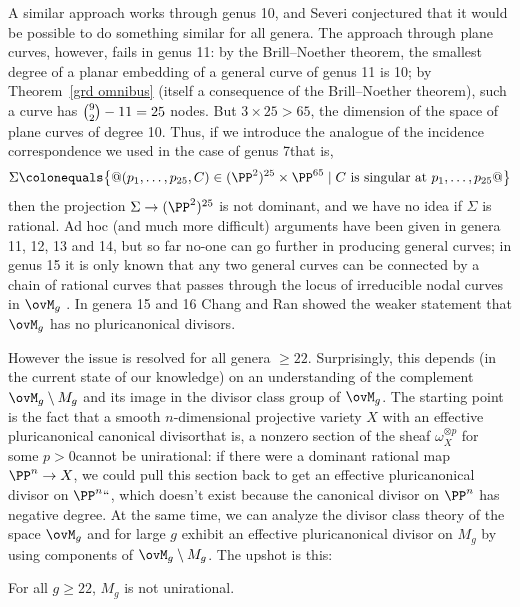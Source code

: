 A similar approach works through genus 10, and Severi conjectured that
%
it would be possible to do something similar for all genera. The
approach through plane curves, however, fails in genus 11: by the
Brill--Noether theorem,
%
the smallest degree of a planar embedding of a general curve of genus
11 is 10; by Theorem~\ref{grd omnibus} (itself a consequence of
the Brill--Noether theorem), such a curve has $\tbinom{9}{2}-11 = 25$
nodes. But $3 \times 25 > 65$, the dimension of the space of plane
curves of degree 10. Thus, if we introduce the analogue of the
incidence correspondence
%
we used in the case of genus 7\emdash that is,
$$
\Sigma \colonequals\bigl\{@(p_1,\dots,p_{25},C)\in(\PP^2)^{25} \times \PP^{65} 
\mid C \text{ is singular at } p_1,\dots,p_{25} @\bigr\}
$$
\emdash
then the projection $\Sigma \to (\PP^2)^{25}$ is not dominant, and we have no idea if $\Sigma$ is rational.
Ad hoc (and much more difficult) arguments have been given in genera
11, 12, 13 and 14, but so far no-one can go further in producing
general curves; in genus 15 it is only known that
 any two general curves can be 
\null connected by a chain of rational curves that passes through
the locus of irreducible nodal curves in $\ovM_{g}$
\cite{MR2202246}. In genera 15 and 16 Chang and Ran showed
the  weaker statement
that $\ovM_{g}$ has no pluricanonical divisors.%
{\meshing\par}

However the issue is resolved for all genera $\geq 22$. Surprisingly, this depends (in the current state of our knowledge) on an understanding of the complement
$\ovM_{g}\setminus M_{g}$ and its image in the divisor class group of
$\ovM_{g}$. The starting point is the fact that a smooth
$n$-dimensional projective variety $X$ with an effective
pluricanonical canonical divisor\emdash that is, a nonzero section of
the sheaf $\omega_{X}^{\otimes p}$ for some $p>0$\emdash cannot be
unirational: if there were a
dominant rational map
%
$\PP^n \to X$, we
could pull this section back to get an effective pluricanonical
divisor on $\PP^n` `$, which doesn't exist because
the canonical divisor on $\PP^{n}$ has negative degree. At the same
time, we can analyze the divisor class theory of the space $\ovM_g$
and for large $g$ exhibit an effective pluricanonical divisor on $M_g$
by using components of  $\ovM_{g}\setminus M_{g}$.
The upshot is this:

\begin{npt}
\begin{theorem}
For all $g \geq 22$, $M_g$ is not unirational.
\unif
\end{theorem}
\end{npt}

